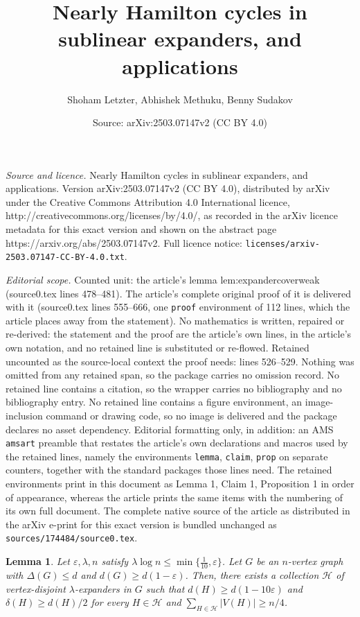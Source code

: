 \documentclass[10pt,a4paper]{amsart}
\title{Nearly Hamilton cycles in sublinear expanders, and applications}
\author{Shoham Letzter, Abhishek Methuku, Benny Sudakov}
\date{Source: arXiv:2503.07147v2 (CC BY 4.0)}
\newtheorem{lemma}{Lemma}
\newcommand{\cH}{\mathcal{H}}
\newcommand{\eps}{\varepsilon}
\begin{document}
\maketitle

\noindent\emph{Source and licence.} Nearly Hamilton cycles in sublinear expanders, and applications. Version arXiv:2503.07147v2 (CC BY 4.0), distributed by arXiv under the Creative Commons Attribution 4.0 International licence, http://creativecommons.org/licenses/by/4.0/, as recorded in the arXiv licence metadata for this exact version and shown on the abstract page https://arxiv.org/abs/2503.07147v2. Full licence notice: \texttt{licenses/arxiv-2503.07147-CC-BY-4.0.txt}.\par\smallskip

\noindent\textit{Editorial scope.} Counted unit: the article's lemma lem:expandercoverweak (source0.tex lines 478--481). The article's complete original proof of it is delivered with it (source0.tex lines 555--666, one \texttt{proof} environment of 112 lines, which the article places away from the statement). No mathematics is written, repaired or re-derived: the statement and the proof are the article's own lines, in the article's own notation, and no retained line is substituted or re-flowed.  Retained uncounted as the source-local context the proof needs: lines 526--529.  Nothing was omitted from any retained span, so the package carries no omission record.  No retained line contains a citation, so the wrapper carries no bibliography and no bibliography entry.  No retained line contains a figure environment, an image-inclusion command or drawing code, so no image is delivered and the package declares no asset dependency.  Editorial formatting only, in addition: an AMS \texttt{amsart} preamble that restates the article's own declarations and macros used by the retained lines, namely the environments \texttt{lemma}, \texttt{claim}, \texttt{prop} on separate counters, together with the standard packages those lines need.  The retained environments print in this document as Lemma 1, Claim 1, Proposition 1 in order of appearance, whereas the article prints the same items with the numbering of its own full document.  The complete native source of the article as distributed in the arXiv e-print for this exact version is bundled unchanged as \texttt{sources/174484/source0.tex}.
\begin{lemma}
	\label{lem:packingoneround}
	Let $\eps, \lambda, n$ satisfy $\lambda \log n \le \min \{\frac{1}{10}, \eps \}$. Let $G$ be an $n$-vertex graph with $\Delta(G) \le d$ and $d(G) \ge d(1- \eps)$. Then, there exists a collection $\cH$ of vertex-disjoint $\lambda$-expanders in $G$ such that $d(H) \ge d(1-10 \eps)$ and $\delta(H) \ge d(H)/2$ for every $H \in \cH$ and $\sum_{H \in \cH} |V(H)| \ge n/4$.
\end{lemma}
\end{document}
